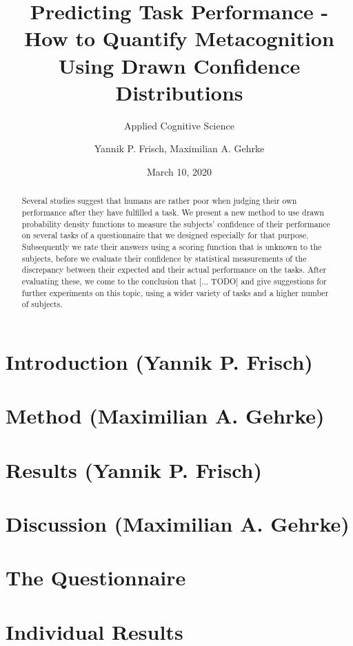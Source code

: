 \documentclass[
pdfa=false,  %
color=9c,
logo=body,
class=article,
marginpar=false,
logofile=../logos/tuda_logo.pdf
]{tudapub}
\author{Yannik P. Frisch, Maximilian A. Gehrke}
\title{Predicting Task Performance - How to Quantify Metacognition Using Drawn Confidence Distributions}
\date{March 10, 2020}
\subtitle{Applied Cognitive Science}
\begin{document}
\maketitle

\begin{abstract}
	Several studies suggest that humans are rather poor when judging their own performance after they have fulfilled a task. We present a new method to use drawn probability density functions to measure the subjects' confidence of their performance on several tasks of a questionnaire that we designed especially for that purpose. Subsequently we rate their answers using a scoring function that is unknown to the subjects, before we evaluate their confidence by statistical measurements of the discrepancy between their expected and their actual performance on the tasks. After evaluating these, we come to the conclusion that [... TODO] and give suggestions for further experiments on this topic, using a wider variety of tasks and a higher number of subjects.
\end{abstract}

\section{Introduction (Yannik P. Frisch)}
	\label{sec:introduction}
	

\newpage
\section{Method (Maximilian A. Gehrke)}
	\label{sec:method}
	

\newpage
\section{Results (Yannik P. Frisch)}
	\label{sec:results}
	

\newpage
\section{Discussion (Maximilian A. Gehrke)}
	\label{sec:discussion}
	


\newpage
{}



\newpage
\begin{appendices}
	\section{The Questionnaire}
		\label{appendix:questionnaire}
		
	\newpage
	\section{Individual Results}
		\label{appendix:individual_results}
		
\end{appendices}
\end{document}
